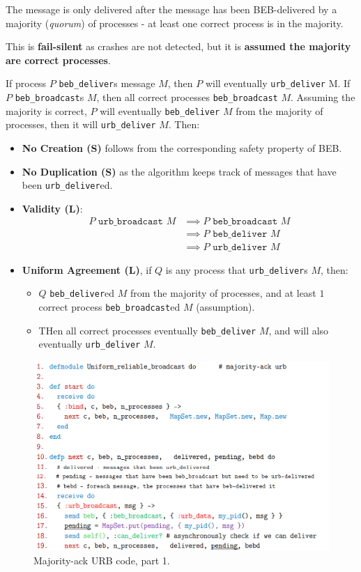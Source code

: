 \documentclass[11pt]{article}
\begin{document}
The message is only delivered after the message has been BEB-delivered by a majority (\textit{quorum}) of processes - at least one correct process is in the majority.

This is \textbf{fail-silent} as crashes are not detected, but it is \textbf{assumed the majority are correct processes}.

If process $P$ \texttt{beb\_deliver}s message $M$, then $P$ will eventually \texttt{urb\_deliver} M.
If $P$ \texttt{beb\_broadcast}s $M$, then all correct processes \texttt{beb\_broadcast} $M$.
Assuming the majority is correct, $P$ will eventually \texttt{beb\_deliver} $M$ from the majority of processes, then it will \texttt{urb\_deliver} $M$.
Then:
\begin{itemize}
  \item \textbf{No Creation (S)} follows from the corresponding safety property of BEB.
  \item \textbf{No Duplication (S)} as the algorithm keeps track of messages that have been \texttt{urb\_deliver}ed.
  \item \textbf{Validity (L)}:
    \begin{align*}
      P \texttt{ urb\_broadcast } M &\implies P \texttt{ beb\_broadcast } M \\
                                    &\implies P \texttt{ beb\_deliver } M \\
                                    &\implies P \texttt{ urb\_deliver } M
    \end{align*}
  \item \textbf{Uniform Agreement (L)}, if $Q$ is any process that \texttt{urb\_deliver}s $M$, then:
    \begin{itemize}
      \item $Q$ \texttt{beb\_deliver}ed $M$ from the majority of processes, and at least $1$ correct process \texttt{beb\_broadcast}ed $M$ (assumption).
      \item THen all correct processes eventually \texttt{beb\_deliver} $M$, and will also eventually \texttt{urb\_deliver} $M$.
    \end{itemize}
\end{itemize}

\begin{figure}[htb!]
  \centering
  \caption{Majority-ack URB code, part 1.}
  \includegraphics[scale=0.3]{urbcode1}
\end{figure}
\end{document}
